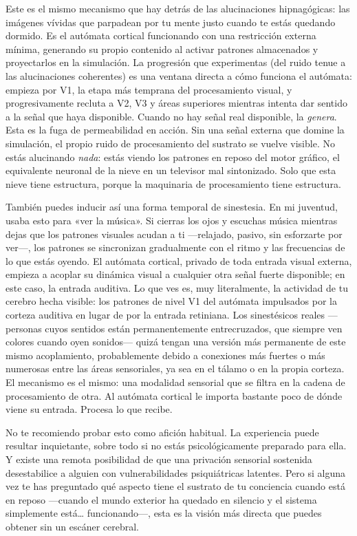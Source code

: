 \documentclass[11pt, twoside, openright]{book}
\begin{document}
Este es el mismo mecanismo que hay detrás de las alucinaciones hipnagógicas: las imágenes vívidas que parpadean por tu mente justo cuando te estás quedando dormido. Es el autómata cortical funcionando con una restricción externa mínima, generando su propio contenido al activar patrones almacenados y proyectarlos en la simulación. La progresión que experimentas (del ruido tenue a las alucinaciones coherentes) es una ventana directa a cómo funciona el autómata: empieza por V1, la etapa más temprana del procesamiento visual, y progresivamente recluta a V2, V3 y áreas superiores mientras intenta dar sentido a la señal que haya disponible. Cuando no hay señal real disponible, la \textit{genera}. Esta es la fuga de permeabilidad en acción. Sin una señal externa que domine la simulación, el propio ruido de procesamiento del sustrato se vuelve visible. No estás alucinando \textit{nada}: estás viendo los patrones en reposo del motor gráfico, el equivalente neuronal de la nieve en un televisor mal sintonizado. Solo que esta nieve tiene estructura, porque la maquinaria de procesamiento tiene estructura.

También puedes inducir así una forma temporal de sinestesia. En mi juventud, usaba esto para «ver la música». Si cierras los ojos y escuchas música mientras dejas que los patrones visuales acudan a ti ---relajado, pasivo, sin esforzarte por ver---, los patrones se sincronizan gradualmente con el ritmo y las frecuencias de lo que estás oyendo. El autómata cortical, privado de toda entrada visual externa, empieza a acoplar su dinámica visual a cualquier otra señal fuerte disponible; en este caso, la entrada auditiva. Lo que ves es, muy literalmente, la actividad de tu cerebro hecha visible: los patrones de nivel V1 del autómata impulsados por la corteza auditiva en lugar de por la entrada retiniana. Los sinestésicos reales ---personas cuyos sentidos están permanentemente entrecruzados, que siempre ven colores cuando oyen sonidos--- quizá tengan una versión más permanente de este mismo acoplamiento, probablemente debido a conexiones más fuertes o más numerosas entre las áreas sensoriales, ya sea en el tálamo o en la propia corteza. El mecanismo es el mismo: una modalidad sensorial que se filtra en la cadena de procesamiento de otra. Al autómata cortical le importa bastante poco de dónde viene su entrada. Procesa lo que recibe.

No te recomiendo probar esto como afición habitual. La experiencia puede resultar inquietante, sobre todo si no estás psicológicamente preparado para ella. Y existe una remota posibilidad de que una privación sensorial sostenida desestabilice a alguien con vulnerabilidades psiquiátricas latentes. Pero si alguna vez te has preguntado qué aspecto tiene el sustrato de tu conciencia cuando está en reposo ---cuando el mundo exterior ha quedado en silencio y el sistema simplemente está… funcionando---, esta es la visión más directa que puedes obtener sin un escáner cerebral.
\end{document}
